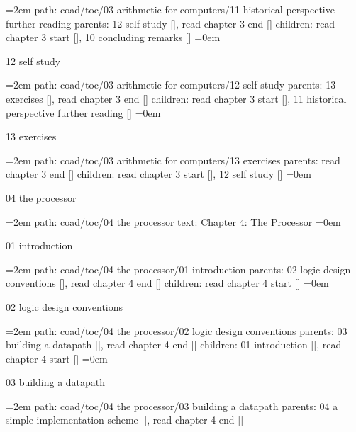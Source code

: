 \leftskip=2em
path: coad/toc/03 arithmetic for computers/11 historical perspective further reading
\smallskip
parents:  12 self study [], read chapter 3 end []
\smallskip
children: read chapter 3 start [], 10 concluding remarks []
\smallskip
\leftskip=0em
\par\endgroup
\bigskip
{}
12 self study
\smallskip
\par\begingroup
\leftskip=2em
path: coad/toc/03 arithmetic for computers/12 self study
\smallskip
parents:  13 exercises [], read chapter 3 end []
\smallskip
children: read chapter 3 start [], 11 historical perspective further reading []
\smallskip
\leftskip=0em
\par\endgroup
\bigskip
{}
13 exercises
\smallskip
\par\begingroup
\leftskip=2em
path: coad/toc/03 arithmetic for computers/13 exercises
\smallskip
parents:  read chapter 3 end []
\smallskip
children: read chapter 3 start [], 12 self study []
\smallskip
\leftskip=0em
\par\endgroup
\bigskip
{}
04 the processor
\smallskip
\par\begingroup
\leftskip=2em
path: coad/toc/04 the processor
\smallskip
text:  Chapter 4: The Processor
\smallskip
\leftskip=0em
\par\endgroup
\bigskip
{}
01 introduction
\smallskip
\par\begingroup
\leftskip=2em
path: coad/toc/04 the processor/01 introduction
\smallskip
parents:  02 logic design conventions [], read chapter 4 end []
\smallskip
children: read chapter 4 start []
\smallskip
\leftskip=0em
\par\endgroup
\bigskip
{}
02 logic design conventions
\smallskip
\par\begingroup
\leftskip=2em
path: coad/toc/04 the processor/02 logic design conventions
\smallskip
parents:  03 building a datapath [], read chapter 4 end []
\smallskip
children: 01 introduction [], read chapter 4 start []
\smallskip
\leftskip=0em
\par\endgroup
\bigskip
{}
03 building a datapath
\smallskip
\par\begingroup
\leftskip=2em
path: coad/toc/04 the processor/03 building a datapath
\smallskip
parents:  04 a simple implementation scheme [], read chapter 4 end []
\smallskip

